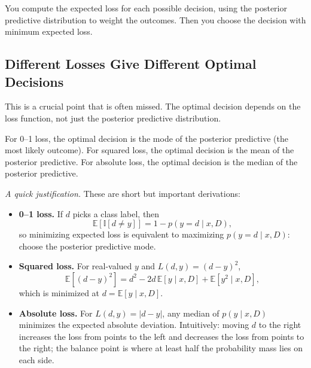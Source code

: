 You compute the expected loss for each possible decision, using the posterior predictive distribution to weight the outcomes. Then you choose the decision with minimum expected loss.

\subsection{Different Losses Give Different Optimal Decisions}

This is a crucial point that is often missed. The optimal decision depends on the loss function, not just the posterior predictive distribution.

For 0--1 loss, the optimal decision is the mode of the posterior predictive (the most likely outcome). For squared loss, the optimal decision is the mean of the posterior predictive. For absolute loss, the optimal decision is the median of the posterior predictive.

\vspace{0.5em}

\noindent\textit{A quick justification.} These are short but important derivations:

\begin{itemize}
\item \textbf{0--1 loss.} If $d$ picks a class label, then
\[
\mathbb{E}[\mathbb{I}[d\neq y]] = 1 - p(y=d\mid x,D),
\]
so minimizing expected loss is equivalent to maximizing $p(y=d\mid x,D)$: choose the posterior predictive mode.

\item \textbf{Squared loss.} For real-valued $y$ and $L(d,y)=(d-y)^2$,
\[
\mathbb{E}[(d-y)^2] = d^2 - 2d\,\mathbb{E}[y\mid x,D] + \mathbb{E}[y^2\mid x,D],
\]
which is minimized at $d=\mathbb{E}[y\mid x,D]$.

\item \textbf{Absolute loss.} For $L(d,y)=|d-y|$, any median of $p(y\mid x,D)$ minimizes the expected absolute deviation. Intuitively: moving $d$ to the right increases the loss from points to the left and decreases the loss from points to the right; the balance point is where at least half the probability mass lies on each side.
\end{itemize}

\vspace{1.5em}


